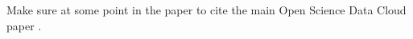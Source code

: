 \documentclass[conference,letterpaper]{IEEEtran}
\begin{document}
Make sure at some point in the paper to cite the main Open Science Data Cloud paper \cite{Grossman2012}.




\end{document}
